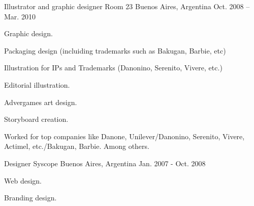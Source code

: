 \begin{cventries}
{    }
  \cventry
    {Illustrator and graphic designer} %
    {Room 23} %
    {Buenos Aires, Argentina} %
    {Oct. 2008 – Mar. 2010} %
    {
      \begin{cvitems} %
        \item {Graphic design.}
        \item {Packaging design (incluiding trademarks such as Bakugan, Barbie, etc)}
        \item {Illustration for IPs and Trademarks (Danonino, Serenito, Vivere, etc.)}
        \item {Editorial illustration.}
        \item {Advergames art design.}
        \item {Storyboard creation.}
        \item {Worked for top companies like Danone, Unilever/Danonino, Serenito, Vivere, Actimel, etc./Bakugan, Barbie. Among others.}
      \end{cvitems}
    }
  \cventry
    {Designer} %
    {Syscope} %
    {Buenos Aires, Argentina} %
    {Jan. 2007 - Oct. 2008} %
    {
      \begin{cvitems} %
        \item {Web design.}
        \item {Branding design.}
      \end{cvitems}
    }
\end{cventries}
